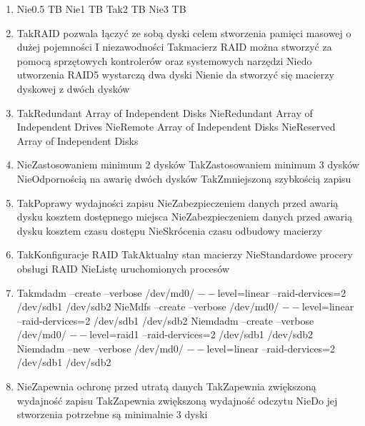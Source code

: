 \begin{enumerate}
	\newpage
	\item {}%
	{Nie}{0.5 TB}%
	{Nie}{1 TB}%
	{Tak}{2 TB}%
	{Nie}{3 TB}
	\item {}%
	{Tak}{RAID pozwala łączyć ze sobą dyski celem stworzenia pamięci masowej o dużej pojemności I niezawodności}%
	{Tak}{macierz RAID można stworzyć za pomocą sprzętowych kontrolerów oraz systemowych narzędzi}%
	{Nie}{do utworzenia RAID5 wystarczą dwa dyski}%
	{Nie}{nie da stworzyć się macierzy dyskowej z dwóch dysków}
	\item {}%
	{Tak}{Redundant Array of Independent Disks}%
	{Nie}{Redundant Array of Independent Drives}%
	{Nie}{Remote Array of Independent Disks}%
	{Nie}{Reserved Array of Independent Disks}
	\item {}%
	{Nie}{Zastosowaniem minimum 2 dysków}%
	{Tak}{Zastosowaniem minimum 3 dysków}%
	{Nie}{Odpornością na awarię dwóch dysków}%
	{Tak}{Zmniejszoną szybkością zapisu}
	\item {}%
	{Tak}{Poprawy wydajności zapisu}%
	{Nie}{Zabezpieczeniem danych przed awarią dysku kosztem dostępnego miejsca}%
	{Nie}{Zabezpieczeniem danych przed awarią dysku kosztem czasu dostępu}%
	{Nie}{Skrócenia czasu odbudowy macierzy}
	\item {}%
	{Tak}{Konfiguracje RAID}%
	{Tak}{Aktualny stan macierzy}%
	{Nie}{Standardowe procery obsługi RAID}%
	{Nie}{Listę uruchomionych procesów}
	\item {}%
	{Tak}{mdadm –create –verbose /dev/md0/ $ -- $level=linear –raid-dervices=2 /dev/sdb1 /dev/sdb2}%
	{Nie}{Mdfs –create –verbose /dev/md0/ $ -- $level=linear –raid-dervices=2 /dev/sdb1 /dev/sdb2}%
	{Nie}{mdadm –create –verbose /dev/md0/ $ -- $level=raid1 –raid-dervices=2 /dev/sdb1 /dev/sdb2}%
	{Nie}{mdadm –new –verbose /dev/md0/ $ -- $level=linear –raid-dervices=2 /dev/sdb1 /dev/sdb2}
	\item {}%
	{Nie}{Zapewnia ochronę przed utratą danych}%
	{Tak}{Zapewnia zwiększoną wydajność zapisu}%
	{Tak}{Zapewnia zwiększoną wydajność odczytu}%
	{Nie}{Do jej stworzenia potrzebne są minimalnie 3 dyski}
	

\end{enumerate}
